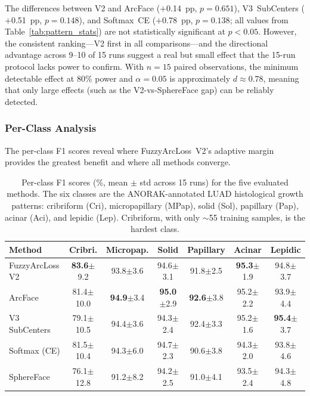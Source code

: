 The differences between V2 and ArcFace ($+$0.14~pp, $p = 0.651$),
V3~SubCenters ($+$0.51~pp, $p = 0.148$), and Softmax~CE ($+$0.78~pp,
$p = 0.138$; all values from Table~\ref{tab:pattern_stats}) are not
statistically significant at $p < 0.05$.
However, the consistent ranking---V2 first in all comparisons---and the
directional advantage across 9--10 of 15 runs suggest a real but small
effect that the 15-run protocol lacks power to confirm.
With $n = 15$ paired observations, the minimum detectable effect at
80\% power and $\alpha = 0.05$ is approximately $d \approx 0.78$,
meaning that only large effects (such as the V2-vs-SphereFace gap) can
be reliably detected.


\subsubsection{Per-Class Analysis}
\label{sec:eval:pattern:perclass}

The per-class F1 scores reveal where FuzzyArcLoss~V2's adaptive margin
provides the greatest benefit and where all methods converge.

\begin{table}[ht!]
\centering
\small
\caption{Per-class F1 scores (\%, mean $\pm$ std across 15 runs) for
the five evaluated methods.
The six classes are the ANORAK-annotated LUAD histological growth
patterns: cribriform (Cri), micropapillary (MPap), solid (Sol),
papillary (Pap), acinar (Aci), and lepidic (Lep).
Cribriform, with only $\sim$55 training samples, is the hardest class.}
\label{tab:perclass_f1}

\begin{tabular}{l c c c c c c}
\hline
\textbf{Method} &
  {\textbf{Cribri.}} & {\textbf{Micropap.}} & {\textbf{Solid}} &
  {\textbf{Papillary}} & {\textbf{Acinar}} & {\textbf{Lepidic}} \\
\hline
FuzzyArcLoss V2 &
  \textbf{83.6}$\pm$9.2 & 93.8$\pm$3.6 & 94.6$\pm$3.1 &
  91.8$\pm$2.5 & \textbf{95.3}$\pm$1.9 & 94.8$\pm$3.7 \\
ArcFace &
  81.4$\pm$10.0 & \textbf{94.9}$\pm$3.4 & \textbf{95.0}$\pm$2.9 &
  \textbf{92.6}$\pm$3.8 & 95.2$\pm$2.2 & 93.9$\pm$4.4 \\
V3 SubCenters &
  79.1$\pm$10.5 & 94.4$\pm$3.6 & 94.3$\pm$2.4 &
  92.4$\pm$3.3 & 95.2$\pm$1.6 & \textbf{95.4}$\pm$3.7 \\
Softmax (CE) &
  81.5$\pm$10.4 & 94.3$\pm$6.0 & 94.7$\pm$2.3 &
  90.6$\pm$3.8 & 94.3$\pm$2.0 & 93.8$\pm$4.6 \\
SphereFace &
  76.1$\pm$12.8 & 91.2$\pm$8.2 & 94.2$\pm$2.5 &
  91.0$\pm$4.1 & 93.5$\pm$2.4 & 94.3$\pm$4.8 \\
\hline
\end{tabular}
\end{table}

